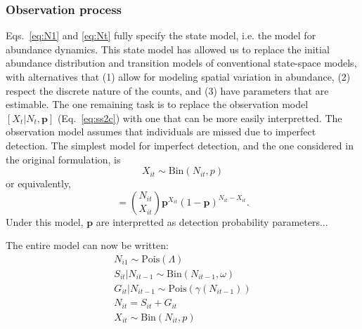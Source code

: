 \documentclass[12pt]{article}
\begin{document}

\subsubsection{Observation process}

Eqs.~\ref{eq:N1} and \ref{eq:Nt} fully specify the state model, i.e. the
model for abundance dynamics. This state
model has allowed us to replace the initial abundance distribution and
transition models of conventional state-space models, with
alternatives that (1) allow for modeling spatial variation in
abundance, (2) respect the discrete nature of the counts, and (3) have
parameters that are estimable. The one
remaining task is to replace the observation model
$[X_t|N_t, \bm{p}]$ (Eq.~\ref{eq:ss2c}) with one that can be more
easily interpretted. The observation
model assumes that individuals are missed due to imperfect
detection. The simplest model for imperfect detection, and the one
considered in the original formulation, is
\begin{equation}
  X_{it} \sim \mathrm{Bin}(N_{it}, p)
  \label{eq:p1}
\end{equation}
or equivalently,
\begin{equation}
  [X_{it} | N_{it}, \bm{p}] = \binom{N_{it}}{X_{it}} \bm{p}^{X_{it}}(1-\bm{p})^{N_{it}-X_{it}}.
  \label{eq:1}
\end{equation}
Under this model, $\bm{p}$ are interpretted as detection probability
parameters...


The entire model can now be written:
\begin{gather}
  N_{i1} \sim \text{Pois}(\Lambda) \nonumber \\
  S_{it}|N_{it-1} \sim \mathrm{Bin}(N_{it-1}, \omega) \nonumber \\
  G_{it}|N_{it-1}\sim \mathrm{Pois}(\gamma(N_{it-1})) \\
  N_{it} = S_{it}+G_{it} \nonumber \\
  X_{it} \sim \text{Bin}(N_{it}, p) \nonumber
  \label{eq:hm}
\end{gather}
\end{document}
